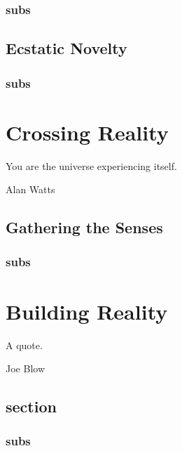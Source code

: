 \documentclass{UIdahoMastersThesis}
\begin{document}
\subsection{subs}

\section{Ecstatic Novelty}


\subsection{subs}

\chapter{Crossing Reality}
\label{Chapter:CrossingReality}
\epigraph {You are the universe experiencing itself.}{Alan Watts}

\vspace{9mm}

\section{Gathering the Senses}

\subsection{subs}

\chapter{Building Reality}
\label{Chapter:BuildingReality}
\epigraph {A quote.}{Joe Blow}

\vspace{9mm}


\section{section}

\subsection{subs}

\end{document}

